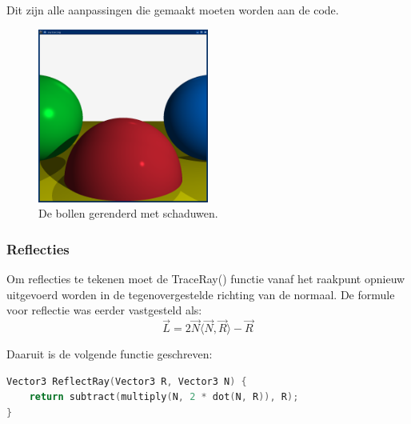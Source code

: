 \documentclass[12pt, a4paper]{article}
\newcommand*{\ora}{\overrightarrow}
\begin{document}
Dit zijn alle aanpassingen die gemaakt moeten worden aan de code.

\begin{figure}[H]
    \centering
    \includegraphics[width=0.50\textwidth]{renders/schaduw.png}
    \caption{De bollen gerenderd met schaduwen.}
    \label{fig:schaduw}
\end{figure}

\subsubsection{Reflecties}

Om reflecties te tekenen moet de TraceRay() functie vanaf het raakpunt opnieuw uitgevoerd worden in de tegenovergestelde richting van de normaal. De formule voor reflectie was eerder vastgesteld als:
\[\ora{L}=2\ora{N}\langle\ora{N},\ora{R}\rangle-\ora{R}\]

Daaruit is de volgende functie geschreven:

\begin{lstlisting}[language=C++]
Vector3 ReflectRay(Vector3 R, Vector3 N) {
    return subtract(multiply(N, 2 * dot(N, R)), R);
}
\end{lstlisting}
\end{document}
